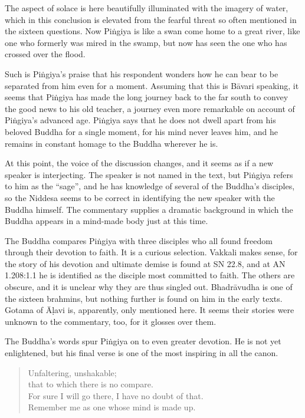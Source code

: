 \documentclass[12pt,openany]{book}%
\begin{document}
The aspect of solace is here beautifully illuminated with the imagery of water, which in this conclusion is elevated from the fearful threat so often mentioned in the sixteen questions. Now \textsanskrit{Piṅgiya} is like a swan come home to a great river, like one who formerly was mired in the swamp, but now has seen the one who has crossed over the flood.

Such is \textsanskrit{Piṅgiya}’s praise that his respondent wonders how he can bear to be separated from him even for a moment. Assuming that this is \textsanskrit{Bāvari} speaking, it seems that \textsanskrit{Piṅgiya} has made the long journey back to the far south to convey the good news to his old teacher, a journey even more remarkable on account of \textsanskrit{Piṅgiya}’s advanced age. \textsanskrit{Piṅgiya} says that he does not dwell apart from his beloved Buddha for a single moment, for his mind never leaves him, and he remains in constant homage to the Buddha wherever he is.

At this point, the voice of the discussion changes, and it seems as if a new speaker is interjecting. The speaker is not named in the text, but \textsanskrit{Piṅgiya} refers to him as the “sage”, and he has knowledge of several of the Buddha’s disciples, so the Niddesa seems to be correct in identifying the new speaker with the Buddha himself. The commentary supplies a dramatic background in which the Buddha appears in a mind-made body just at this time.

The Buddha compares \textsanskrit{Piṅgiya} with three disciples who all found freedom through their devotion to faith. It is a curious selection. Vakkali makes sense, for the story of his devotion and ultimate demise is found at SN 22.8, and at AN 1.208:1.1 he is identified as the disciple most committed to faith. The others are obscure, and it is unclear why they are thus singled out. \textsanskrit{Bhadrāvudha} is one of the sixteen brahmins, but nothing further is found on him in the early texts. Gotama of \textsanskrit{Āḷavi} is, apparently, only mentioned here. It seems their stories were unknown to the commentary, too, for it glosses over them.

The Buddha’s words spur \textsanskrit{Piṅgiya} on to even greater devotion. He is not yet enlightened, but his final verse is one of the most inspiring in all the canon.

\begin{verse}%
Unfaltering, unshakable; \\
that to which there is no compare. \\
For sure I will go there, I have no doubt of that. \\
Remember me as one whose mind is made up.

%
\end{verse}
\end{document}
